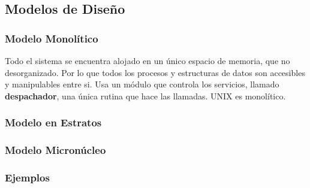 \subsection{Modelos de Diseño}
\subsubsection{Modelo Monolítico}
\noindent Todo el sistema se encuentra alojado en un único espacio de memoria, que no desorganizado. Por lo que todos los procesos y estructuras de datos son accesibles y manipulables entre si. Usa un módulo que controla los servicios, llamado \textbf{despachador}, una única rutina que hace las llamadas. UNIX es monolítico.
\subsubsection{Modelo en Estratos}
\subsubsection{Modelo Micronúcleo}
\subsubsection{Ejemplos}
